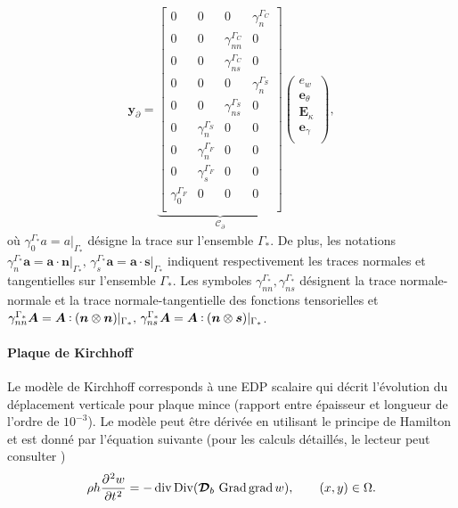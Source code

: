 \begin{equation}
\begin{aligned}
\bm{y}_\partial = \underbrace{
	\begin{bmatrix}
	{0} & {0} & {0} & \gamma_{n}^{\Gamma_C} \\
	{0} & {0} & \gamma_{nn}^{\Gamma_C} & {0} \\
	{0} & {0} & \gamma_{ns}^{\Gamma_C} & {0} \\
	{0} & {0} & {0} & \gamma_{n}^{\Gamma_S} \\
	{0} & {0} & \gamma_{ns}^{\Gamma_S} & {0} \\
	{0} & \gamma_{n}^{\Gamma_S} & {0} & {0} \\
	{0} & \gamma_{n}^{\Gamma_F} & {0} & {0} \\
	{0} & \gamma_{s}^{\Gamma_F} & {0} & {0} \\
	\gamma_{0}^{\Gamma_F} & {0} & {0} & {0} \\
	\end{bmatrix}}_{\mathcal{C}_\partial}
\begin{pmatrix}
e_w \\
\bm{e}_{\theta} \\
\bm{E}_{\kappa} \\
\bm{e}_{\gamma} \\
\end{pmatrix},
\end{aligned}
\end{equation}
où $\gamma_{0}^{\Gamma_*} a = a \vert_{\Gamma_*} $ désigne la trace sur l'ensemble $\Gamma_*$. De plus, les notations $\gamma_{n}^{\Gamma_*} \bm{a} = \bm{a} \cdot \bm{n} \vert_{\Gamma_*}, \, \gamma_{s}^{\Gamma_*} \bm{a} = \bm{a} \cdot \bm{s} \vert_{\Gamma_*} $ indiquent respectivement les traces normales et tangentielles sur l'ensemble $\Gamma_* $. Les symboles $\gamma_{nn}^{\Gamma_*}, \gamma_{ns}^{\Gamma_*} $ désignent la trace normale-normale et la trace normale-tangentielle des fonctions tensorielles et $ \gamma_{nn}^{\Gamma_*} \bm{A} = \bm{A} \cddot (\bm{n} \otimes \bm{n}) \vert_{\Gamma_*}, \, \gamma_{ns}^{\Gamma_*} \bm{A} = \bm{A} \cddot (\bm{n} \otimes \bm{s}) \vert_{\Gamma_*} $. 

\paragraph{Plaque de Kirchhoff}
Le modèle de Kirchhoff corresponds à une EDP scalaire qui décrit l'évolution du déplacement verticale pour plaque mince (rapport entre épaisseur et longueur de l'ordre de $10^{-3}$). Le modèle peut être dérivée en utilisant le principe de Hamilton et est donné par l'équation suivante (pour les calculs détaillés, le lecteur peut consulter \cite[Chapter 3]{reddy2006theory})
\begin{equation}
\rho h \diffp[2]{w}{t} = - \div\Div (\bm{\mathcal{D}}_b\, \Grad\grad{w}), \qquad (x,y) \in \Omega.
\end{equation}

